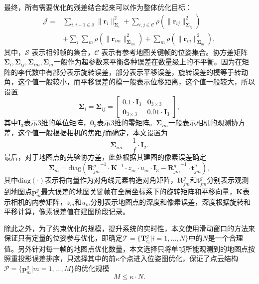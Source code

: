 最终，所有需要优化的残差结合起来可以作为整体优化目标：
\begin{equation}
\begin{aligned}
  \mathcal{J} = & \sum_{i,i+1\in\mathcal{S}}\|\symbf{r}_i\|_{\symbf{\Sigma}_{i}}^2 + \sum_{i,j\in\mathcal{C}}\rho(\|\symbf{r}_{ij}\|_{\symbf{\Sigma}_{ij}}^2) \\ 
  &+ \sum_i \sum_m \rho(\| \symbf{r}_{im} \|_{\symbf{\Sigma}_{im}}^2) + \sum_m \rho(\| \symbf{r}_m \|_{\symbf{\Sigma}_{m}}^2),
\end{aligned}
\end{equation}
其中，$\mathcal{S}$ 表示相邻帧的集合，$\mathcal{C}$ 表示有参考地图关键帧的位姿集合。协方差矩阵$\symbf{\Sigma}_{i},\symbf{\Sigma}_{ij},\symbf{\Sigma}_{im},\symbf{\Sigma}_{m}$一般作为超参数来平衡各种误差在数量级上的不平衡。因为在矩阵的李代数中有部分表示旋转误差，部分表示平移误差，旋转误差的模等于转动角，这个值一般较小，而平移误差的模一般表示位移距离，这个值一般较大，所以设置
\begin{equation}
  \symbf{\Sigma}_{i} = \symbf{\Sigma}_{ij} = 
  \begin{bmatrix}
    0.1 \cdot \symbf{I}_3 & \symbf{0}_{3\times 3} \\
    \symbf{0}_{3\times 3} & 0.01 \cdot \symbf{I}_3
  \end{bmatrix},
\end{equation}
其中$\symbf{I}_3$表示3维的单位矩阵，$\symbf{0}_3$表示3维的零矩阵。$\symbf{\Sigma}_{im}$一般表示相机的观测协方差，这个值一般根据相机的焦距$f$而确定，本文设置为
\begin{equation}
  \symbf{\Sigma}_{im} = \frac{1}{f} \cdot \symbf{I}_2.
\end{equation}
最后，对于地图点的先验协方差，此处根据其建图的像素误差确定
\begin{equation}
  \symbf{\Sigma}_{m} = \text{diag}({\symbf{R}_{jm}^g}^{-1}\cdot\symbf{K}^{-1}\cdot z_m \cdot u_m \cdot \symbf{I}_3 - {\symbf{R}_{jm}^g}^{-1}\cdot\symbf{t}_{jm}^g),
\end{equation}
其中$\text{diag}(\cdot)$表示将向量作为对角线元素构造对角矩阵，$\symbf{R}_{jm}^g$和$\symbf{t}_{jm}^g$分别表示观测到地图点$\symbf{p}_m^g$最大误差的地图关键帧在全局坐标系下的旋转矩阵和平移向量，$\symbf{K}$表示相机的内参矩阵，$z_m$和$u_m$分别表示地图点的深度和像素误差，深度根据旋转和平移计算，像素误差值在建图阶段记录。

除此之外，为了约束优化的规模，提升系统的实时性，本文使用滑动窗口的方法来保证只有定量的位姿参与优化，即确定$\mathcal{T} = \{ \symbf{T}_{c_i}^g | i=1,\dots, N\}$中的$N$是一个合理值。另外针对每一帧的地图点优化数量，本文选择只将单帧所能观测到的地图点按照重投影误差排序，只选择其中的前$\kappa$个点进入位姿图优化，保证了点云结构$\mathcal{P} = \{\symbf{p}^g_m | m = 1, \dots, M\}$的优化规模
\begin{equation}
  M \le \kappa \cdot N.
\end{equation}

